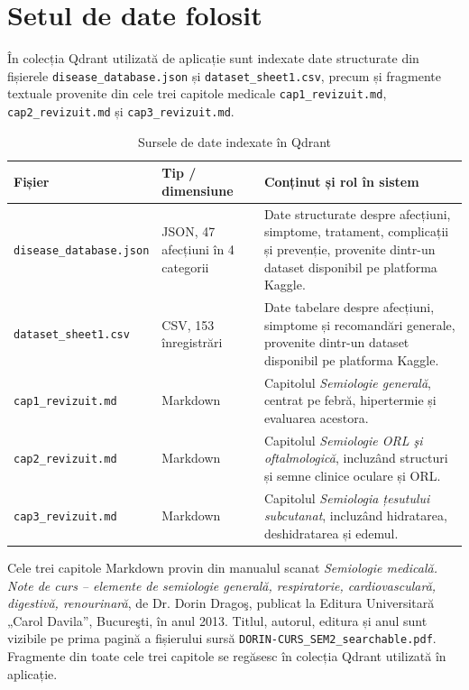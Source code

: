 \documentclass[12pt, a4paper, oneside, romanian]{teza-upb}
\begin{document}
\section{Setul de date folosit}

În colecția Qdrant utilizată de aplicație sunt indexate date structurate din fișierele \texttt{disease\_database.json} și \texttt{dataset\_sheet1.csv}, precum și fragmente textuale provenite din cele trei capitole medicale \texttt{cap1\_revizuit.md}, \texttt{cap2\_revizuit.md} și \texttt{cap3\_revizuit.md}.

\begin{table}[H]
\centering
\caption{Sursele de date indexate în Qdrant}
\label{tab:surse-ingestie}
\small
\begin{tabular}{|p{4.2cm}|p{2.3cm}|p{6.5cm}|}
\hline
\textbf{Fișier} & \textbf{Tip / dimensiune} & \textbf{Conținut și rol în sistem} \\
\hline
\texttt{disease\_database.json} & JSON, 47 afecțiuni în 4 categorii & Date structurate despre afecțiuni, simptome, tratament, complicații și prevenție, provenite dintr-un dataset disponibil pe platforma Kaggle. \\
\hline
\texttt{dataset\_sheet1.csv} & CSV, 153 înregistrări & Date tabelare despre afecțiuni, simptome și recomandări generale, provenite dintr-un dataset disponibil pe platforma Kaggle. \\
\hline
\texttt{cap1\_revizuit.md} & Markdown & Capitolul \textit{Semiologie generală}, centrat pe febră, hipertermie și evaluarea acestora. \\
\hline
\texttt{cap2\_revizuit.md} & Markdown & Capitolul \textit{Semiologie ORL şi oftalmologică}, incluzând structuri și semne clinice oculare și ORL. \\
\hline
\texttt{cap3\_revizuit.md} & Markdown & Capitolul \textit{Semiologia țesutului subcutanat}, incluzând hidratarea, deshidratarea și edemul. \\
\hline
\end{tabular}
\end{table}

Cele trei capitole Markdown provin din manualul scanat \textit{Semiologie medicală. Note de curs -- elemente de semiologie generală, respiratorie, cardiovasculară, digestivă, renourinară}, de Dr. Dorin Dragoş, publicat la Editura Universitară „Carol Davila”, Bucureşti, în anul 2013. Titlul, autorul, editura și anul sunt vizibile pe prima pagină a fișierului sursă \texttt{DORIN-CURS\_SEM2\_searchable.pdf}. Fragmente din toate cele trei capitole se regăsesc în colecția Qdrant utilizată în aplicație.
\end{document}
